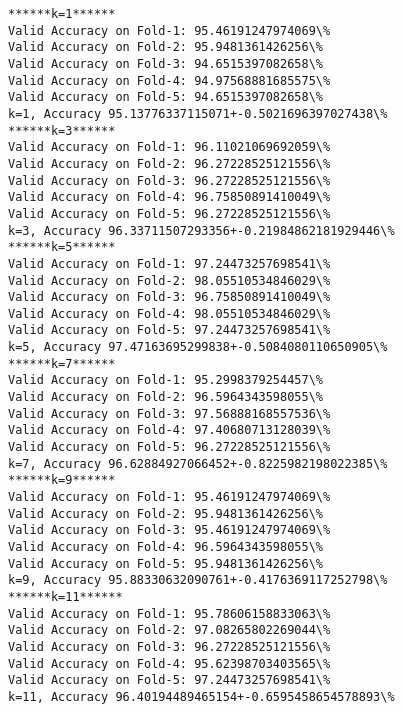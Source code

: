 \documentclass[11pt]{article}
\begin{document}
    \begin{Verbatim}[commandchars=\\\{\}]
******k=1******
Valid Accuracy on Fold-1: 95.46191247974069\%
Valid Accuracy on Fold-2: 95.9481361426256\%
Valid Accuracy on Fold-3: 94.6515397082658\%
Valid Accuracy on Fold-4: 94.97568881685575\%
Valid Accuracy on Fold-5: 94.6515397082658\%
k=1, Accuracy 95.13776337115071+-0.5021696397027438\%
******k=3******
Valid Accuracy on Fold-1: 96.11021069692059\%
Valid Accuracy on Fold-2: 96.27228525121556\%
Valid Accuracy on Fold-3: 96.27228525121556\%
Valid Accuracy on Fold-4: 96.75850891410049\%
Valid Accuracy on Fold-5: 96.27228525121556\%
k=3, Accuracy 96.33711507293356+-0.21984862181929446\%
******k=5******
Valid Accuracy on Fold-1: 97.24473257698541\%
Valid Accuracy on Fold-2: 98.05510534846029\%
Valid Accuracy on Fold-3: 96.75850891410049\%
Valid Accuracy on Fold-4: 98.05510534846029\%
Valid Accuracy on Fold-5: 97.24473257698541\%
k=5, Accuracy 97.47163695299838+-0.5084080110650905\%
******k=7******
Valid Accuracy on Fold-1: 95.2998379254457\%
Valid Accuracy on Fold-2: 96.5964343598055\%
Valid Accuracy on Fold-3: 97.56888168557536\%
Valid Accuracy on Fold-4: 97.40680713128039\%
Valid Accuracy on Fold-5: 96.27228525121556\%
k=7, Accuracy 96.62884927066452+-0.8225982198022385\%
******k=9******
Valid Accuracy on Fold-1: 95.46191247974069\%
Valid Accuracy on Fold-2: 95.9481361426256\%
Valid Accuracy on Fold-3: 95.46191247974069\%
Valid Accuracy on Fold-4: 96.5964343598055\%
Valid Accuracy on Fold-5: 95.9481361426256\%
k=9, Accuracy 95.88330632090761+-0.4176369117252798\%
******k=11******
Valid Accuracy on Fold-1: 95.78606158833063\%
Valid Accuracy on Fold-2: 97.08265802269044\%
Valid Accuracy on Fold-3: 96.27228525121556\%
Valid Accuracy on Fold-4: 95.62398703403565\%
Valid Accuracy on Fold-5: 97.24473257698541\%
k=11, Accuracy 96.40194489465154+-0.6595458654578893\%
    \end{Verbatim}
\end{document}
